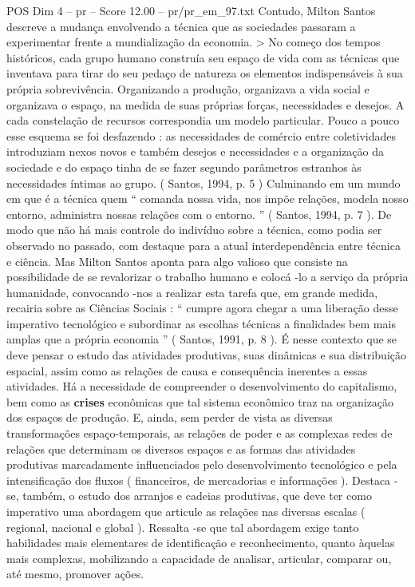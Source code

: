 \begin{textsample}{POS Dim 4 – pr – Score 12.00 – pr/pr\_em\_97.txt}
Contudo, Milton Santos descreve a mudança envolvendo a técnica que as sociedades passaram a experimentar frente a mundialização da economia. > No começo dos tempos históricos, cada grupo humano construía seu espaço de vida com as técnicas que inventava para tirar do seu pedaço de natureza os elementos indispensáveis à sua própria sobrevivência.
Organizando a produção, organizava a vida social e organizava o espaço, na medida de suas próprias forças, necessidades e desejos.
A cada constelação de recursos correspondia um modelo particular.
Pouco a pouco esse esquema se foi desfazendo : as necessidades de comércio entre coletividades introduziam nexos novos e também desejos e necessidades e a organização da sociedade e do espaço tinha de se fazer segundo parâmetros estranhos às necessidades íntimas ao grupo. ( Santos, 1994, p. 5 ) Culminando em um mundo em que é a técnica quem “ comanda nossa vida, nos impõe relações, modela nosso entorno, administra nossas relações com o entorno. ” ( Santos, 1994, p. 7 ).
De modo que não há mais controle do indivíduo sobre a técnica, como podia ser observado no passado, com destaque para a atual interdependência entre técnica e ciência.
Mas Milton Santos aponta para algo valioso que consiste na possibilidade de se revalorizar o trabalho humano e colocá -lo a serviço da própria humanidade, convocando -nos a realizar esta tarefa que, em grande medida, recairia sobre as Ciências Sociais : “ cumpre agora chegar a uma liberação desse imperativo tecnológico e subordinar as escolhas técnicas a finalidades bem mais amplas que a própria economia ” ( Santos, 1991, p. 8 ).
É nesse contexto que se deve pensar o estudo das atividades produtivas, suas dinâmicas e sua distribuição espacial, assim como as relações de causa e consequência inerentes a essas atividades.
Há a necessidade de compreender o desenvolvimento do capitalismo, bem como as \textbf{crises} econômicas que tal sistema econômico traz na organização dos espaços de produção.
E, ainda, sem perder de vista as diversas transformações espaço-temporais, as relações de poder e as complexas redes de relações que determinam os diversos espaços e as formas das atividades produtivas marcadamente influenciados pelo desenvolvimento tecnológico e pela intensificação dos fluxos ( financeiros, de mercadorias e informações ).
Destaca -se, também, o estudo dos arranjos e cadeias produtivas, que deve ter como imperativo uma abordagem que articule as relações nas diversas escalas ( regional, nacional e global ).
Ressalta -se que tal abordagem exige tanto habilidades mais elementares de identificação e reconhecimento, quanto àquelas mais complexas, mobilizando a capacidade de analisar, articular, comparar ou, até mesmo, promover ações.

\end{textsample}
